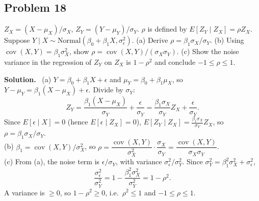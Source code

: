 \documentclass[11pt]{article}
\newcommand{\Norm}{\text{Normal}}
\newenvironment{soln}{\par\smallskip\noindent\textbf{Solution.}\ }{\par\medskip}
\begin{document}
\subsection*{Problem 18}
$Z_X=(X-\mu_X)/\sigma_X$, $Z_Y=(Y-\mu_Y)/\sigma_Y$. $\rho$ is defined by $E[Z_Y\mid Z_X]=\rho Z_X$. Suppose $Y\mid X\sim\Norm(\beta_0+\beta_1X,\sigma_\epsilon^2)$. (a) Derive $\rho=\beta_1\sigma_X/\sigma_Y$. (b) Using $\operatorname{cov}(X,Y)=\beta_1\sigma_X^2$, show $\rho=\operatorname{cov}(X,Y)/(\sigma_X\sigma_Y)$. (c) Show the noise variance in the regression of $Z_Y$ on $Z_X$ is $1-\rho^2$ and conclude $-1\le\rho\le1$.
\begin{soln}
(a) $Y=\beta_0+\beta_1X+\epsilon$ and $\mu_Y=\beta_0+\beta_1\mu_X$, so $Y-\mu_Y=\beta_1(X-\mu_X)+\epsilon$. Divide by $\sigma_Y$:
\[
Z_Y=\frac{\beta_1(X-\mu_X)}{\sigma_Y}+\frac\epsilon{\sigma_Y}=\frac{\beta_1\sigma_X}{\sigma_Y}Z_X+\frac{\epsilon}{\sigma_Y}.
\]
Since $E[\epsilon\mid X]=0$ (hence $E[\epsilon\mid Z_X]=0$), $E[Z_Y\mid Z_X]=\frac{\beta_1\sigma_X}{\sigma_Y}Z_X$, so $\rho=\beta_1\sigma_X/\sigma_Y$.\\
(b) $\beta_1=\operatorname{cov}(X,Y)/\sigma_X^2$, so $\rho=\dfrac{\operatorname{cov}(X,Y)}{\sigma_X^2}\cdot\dfrac{\sigma_X}{\sigma_Y}=\dfrac{\operatorname{cov}(X,Y)}{\sigma_X\sigma_Y}$.\\
(c) From (a), the noise term is $\epsilon/\sigma_Y$, with variance $\sigma_\epsilon^2/\sigma_Y^2$. Since $\sigma_Y^2=\beta_1^2\sigma_X^2+\sigma_\epsilon^2$,
\[
\frac{\sigma_\epsilon^2}{\sigma_Y^2}=1-\frac{\beta_1^2\sigma_X^2}{\sigma_Y^2}=1-\rho^2.
\]
A variance is $\ge0$, so $1-\rho^2\ge0$, i.e.\ $\rho^2\le1$ and $-1\le\rho\le1$.
\end{soln}

\end{document}
